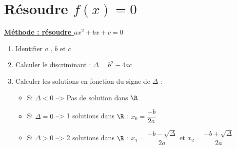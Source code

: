 \section{Résoudre $f(x)=0$}

\ul{\textbf{Méthode : résoudre $ax^2+bx+c=0$}}

\begin{enumerate}
    \item Identifier $a$ , $b$ et $c$
    \item Calculer le discriminant : $\Delta=b^2-4ac$
    \item Calculer les solutions en fonction du signe de $\Delta$ :
          \begin{itemize}
              \item Si $\Delta<0$ --> Pas de solution dans $\R$
              \item Si $\Delta=0$ --> 1 solutions dans $\R$ : $x_0=\dfrac{-b}{2a}$
              \item Si $\Delta>0$ --> 2 solutions dans $\R$ : $x_1=\dfrac{-b-\sqrt{\Delta}}{2a}$ et $x_2=\dfrac{-b+\sqrt{\Delta}}{2a}$
          \end{itemize}
\end{enumerate}



